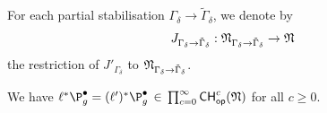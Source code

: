 
For each partial stabilisation $\Gamma_{\delta}\to \tilde{\Gamma}_{\delta}$, we denote by $$J_{\Gamma_{\delta}\to\tilde{\Gamma}_{\delta}}: \frak N_{\Gamma_{\delta}\to\tilde{\Gamma}_{\delta}}\to \frak N$$ the restriction of $J'_{\Gamma_{\delta}}$ to $\frak N_{\Gamma_{\delta}\to \tilde{\Gamma}_{\delta}}$.
\begin{lemma}
\notready\label{lem:N_invariance_P}
We have $\targetmap^* \P_{g}^\bullet = (\sourcemap)^* \P_g^\bullet
\, \in\, \prod_{c=0}^\infty {\mathsf{CH}}^c_{\mathsf{op}}(\frak N)$
for all $c \geq 0$.
\end{lemma}
